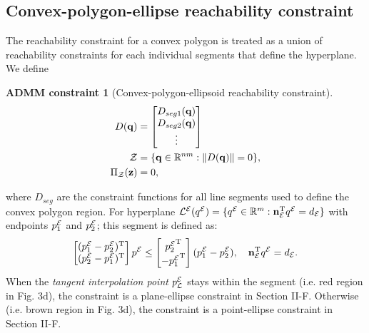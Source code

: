 \documentclass{article}
\newtheorem{constraint}{ADMM constraint}
\newcommand{\news}{\color{blue}}
\begin{document}
\subsection{Convex-polygon-ellipse reachability constraint}\label{sec:ellipse-region-constraint}
{\news  
The reachability constraint for a convex polygon is treated as a union of reachability constraints for each individual segments that define the hyperplane. We define
\setcounter{constraint}{3}
\setcounter{equation}{29}
\begin{constraint}[Convex-polygon-ellipsoid reachability constraint]\label{constraint:polygon-ellipsoid}
\begin{align}
D(\mathbf{q}) &= \begin{bmatrix}D_{seg1}(\mathbf{q})\\D_{seg2}(\mathbf{q})\\ \vdots\end{bmatrix} \label{eq:region_ellipsoid_constraint}\\
  \mathcal{Z} &= \{\mathbf{q}\in\mathbb{R}^{nm}:\lVert D(\mathbf{q})\rVert = 0 \},\\
   \Pi_{\mathcal{Z}}(\mathbf{z}) & = 0, 
\end{align}
\end{constraint}
where $D_{seg}$ are the constraint functions for all line segments used to define the convex polygon region. 
For hyperplane ${\mathcal{L}^{\mathcal{E}}}({q^{\mathcal{E}}}) = \{ {q^{\mathcal{E}}}\in\mathbb{R}^m:  \mathbf{n}_{\mathcal{E}}^\mathrm{T} {q^{\mathcal{E}}} = d_{\mathcal{E}}\}$ with endpoints ${p_1^{\mathcal{E}}}$ and ${p_2^{\mathcal{E}}}$; this segment is defined as:
\begin{equation}
\begin{bmatrix}({p_1^{\mathcal{E}}}- {p_2^{\mathcal{E}}})^\mathrm{T}\\( {p_2^{\mathcal{E}}} - {p_1^{\mathcal{E}}})^\mathrm{T}\end{bmatrix}  {p^{\mathcal{E}}} \leq \begin{bmatrix} {p_2^{\mathcal{E}}}^\mathrm{T}\\- {p_1^{\mathcal{E}}}^\mathrm{T}\end{bmatrix}( {p_1^{\mathcal{E}}}- {p_2^{\mathcal{E}}}), \quad \mathbf{n}_{\mathcal{E}}^\mathrm{T} {q^{\mathcal{E}}} = d_{\mathcal{E}}.
\end{equation}
When the \emph{tangent interpolation point} ${p_{\mathcal{L}}^{\mathcal{E}}}$ stays within the segment (i.e. red region in Fig. 3d), the constraint is a plane-ellipse constraint in Section II-F. Otherwise (i.e. brown region in Fig. 3d), the constraint is a point-ellipse constraint in Section II-F.

}
\end{document}
